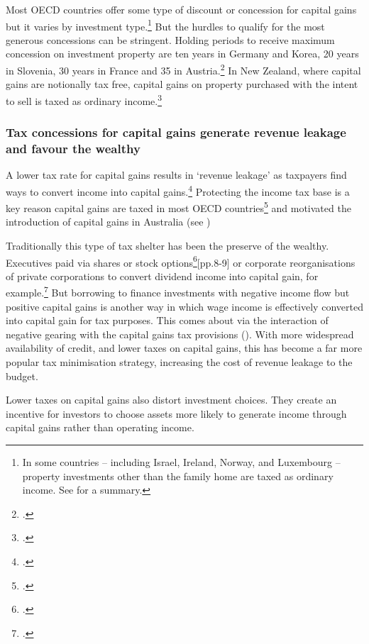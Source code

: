 \documentclass{grattan}\usepackage[]{graphicx}\usepackage[]{color}
\begin{document}
Most OECD countries offer some type of discount or concession for capital gains but it varies by investment type.\footnote{In some countries -- including Israel, Ireland, Norway, and Luxembourg -- property investments other than the family home are taxed as ordinary income. See \textcite{Harding2013} for a summary.}  But the hurdles to qualify for the most generous concessions can be stringent. Holding periods to receive maximum concession on investment property are ten years in Germany and Korea, 20 years in Slovenia, 30 years in France and 35 in Austria.\footcite{Harding2013} In New Zealand, where capital gains are notionally tax free, capital gains on property purchased with the intent to sell is taxed as ordinary income.\footcite[p.~25]{prebble2010tax} 
  
\subsubsection{Tax concessions for capital gains generate revenue leakage and favour the wealthy}
A lower tax rate for capital gains results in `revenue leakage' as taxpayers find ways to convert income into capital gains.\footcites{Evans2005}{Minas2013}  Protecting the income tax base is a key reason capital gains are taxed in most OECD countries\footcite{OECD2006b} and motivated the introduction of capital gains in Australia (see )

Traditionally this type of tax shelter has been the preserve of the wealthy. Executives paid via shares or stock options\footcite{Ingles2009}[pp.8-9] or corporate reorganisations of private corporations to convert dividend income into capital gain, for example.\footcite{Minas2013} But borrowing to finance investments with negative income flow but positive capital gains is another way in which wage income is effectively converted into capital gain for tax purposes. This comes about via the interaction of negative gearing with the capital gains tax provisions (). With more widespread availability of credit, and lower taxes on capital gains, this has become a far more popular tax minimisation strategy, increasing the cost of revenue leakage to the budget.

Lower taxes on capital gains also distort investment choices. They create an incentive for investors to choose assets more likely to generate income through capital gains rather than operating income.
\end{document}
